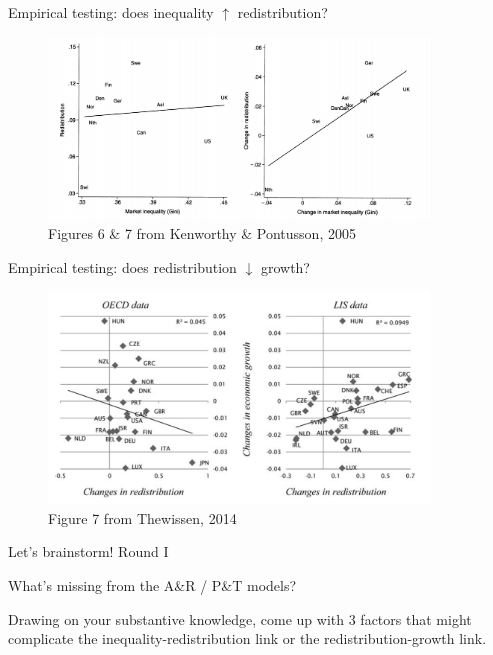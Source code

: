 \documentclass[aspectratio=169]{beamer}
\begin{document}
\begin{frame}{Empirical testing: does inequality $\uparrow$ redistribution?}

\begin{figure}
\includegraphics[width=0.9\textwidth]{kenworthy.png}
\caption*{\footnotesize{Figures 6 \& 7 from Kenworthy \& Pontusson, 2005} }
\end{figure}


\end{frame}

\begin{frame}{Empirical testing: does redistribution $\downarrow$ growth?}

\begin{figure}
\includegraphics[width=0.9\textwidth]{Thewissen.png}
\caption*{\footnotesize{Figure 7 from Thewissen, 2014} }
\end{figure}


\end{frame}
\begin{frame}{Let's brainstorm! Round I}

\Large 
What's missing from the A\&R / P\&T models?

\pause 

\vspace{3em}

\begin{tcolorbox}
Drawing on your substantive knowledge, come up with \alert{3 factors} that might complicate the \alert{inequality-redistribution} link or the \alert{redistribution-growth} link.
\end{tcolorbox}
\end{frame}
\end{document}

